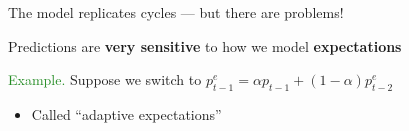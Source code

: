 \documentclass[
    xcolor={svgnames,dvipsnames},
    hyperref={colorlinks, citecolor=DeepPink4, linkcolor=DarkRed, urlcolor=DarkBlue}
    ]{beamer}  %
\newcommand{\Eg}{\textcolor{ForestGreen}{Example. }}
\newcommand{\emp}[1]{\textcolor{DarkOrange1}{\bf #1}}
\newcommand{\1}{\mathbbm 1}
\begin{document}
\begin{frame}
    
    The model replicates cycles --- but there are problems!

    \vspace{1em}
    \vspace{1em}
    Predictions are \emp{very sensitive} to how we model \emp{expectations}

    \vspace{1em}
    \vspace{1em}
    \vspace{1em}
    \Eg Suppose we switch to $p_{t-1}^e = \alpha p_{t-1} + (1-\alpha) p^e_{t-2}$ 

    \vspace{1em}
    \vspace{1em}
    \begin{itemize}
        \item Called ``adaptive expectations''
    \end{itemize}

\end{frame}


\begin{frame}
    
    \begin{figure}
        \centering
    \end{figure}

\end{frame}
\end{document}
